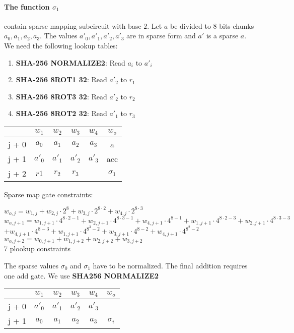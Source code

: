 \paragraph{The function $\sigma_1$} contain sparse mapping subcircuit with base $2$.
Let $a$ be divided to 8 bits-chunks $a_0, a_1, a_2, a_3$.
The values $a'_0, a'_1, a'_2, a'_3$ are in sparse form and $a'$ is a sparse $a$.
We need the following lookup tables:
\begin{enumerate}
\item \textbf{SHA-256 NORMALIZE2}: Read $a_i$ to $a'_i$
\item \textbf{SHA-256 8ROT1 32}: Read $a'_2$ to $r_1$
\item \textbf{SHA-256 8ROT3 32}: Read $a'_2$ to $r_2$ 
\item \textbf{SHA-256 8ROT2 32}: Read $a'_1$ to $r_3$ 
\end{enumerate}
\begin{center}
\begin{tabular}{ c|c|c|c|c|c } 
  & $w_1$ & $w_2$ & $w_3$ & $w_4$ & $w_o$\\ 
 \hline
j + 0 & $a_0$ & $ a_1$ & $a_2$ & $a_3$ & a\\ 
j + 1 & $a'_0$ & $a'_1$ & $a'_2$ & $a'_3$ & acc \\ 
j + 2 & $r1 $& $r_2$ & $r_3$ &   & $\sigma_1$ \\ 
\end{tabular}
\end{center}
Sparse map gate constraints:
\begin{center}
$w_{o,j} = w_{1,j} + w_{2,j} \cdot 2^8 + w_{3,j} \cdot 2^{8 \cdot 2} + w_{4,j} \cdot 2^{8 \cdot 3}$ \\
$w_{o,j + 1} = w_{1,j + 1} \cdot 4^{8 \cdot 2 - 1} + w_{2,j + 1} \cdot 4^{8 \cdot 3 - 1} + w_{4,j + 1} \cdot 4^{8 - 1}
	 	+ w_{1,j + 1} \cdot 4^{8 \cdot 2 - 3} + w_{2,j + 1} \cdot 4^{8 \cdot 3 - 3}$\\
	 $+ w_{4,j + 1} \cdot 4^{8 - 3}
	 	+ w_{1,j + 1} \cdot 4^{8^3 - 2} + w_{3,j + 1} \cdot 4^{8-2} + w_{4,j + 1} \cdot 4^{8^2 - 2}$ \\
$w_{o, j+2} = w_{0, j+1} + w_{1,j+2} + w_{2, j+2} + w_{3, j+2}$ \\
7 plookup constraints \\
\end{center}

The sparse values $\sigma_0$ and $\sigma_1$ have to be normalized.
The final addition requires one add gate.
We use \textbf{SHA256 NORMALIZE2}
\begin{center}
\begin{tabular}{ c|c|c|c|c|c } 
  & $w_1$ & $w_2$ & $w_3$ & $w_4$ & $w_o$\\ 
 \hline
j + 0 & $a'_0$ & $a'_1$ & $a'_2$ & $a'_3$ &\\ 
j + 1 & $a_0$ & $ a_1$ & $a_2$ & $a_3$ &  $\sigma_i$ \\ 
\end{tabular}
\end{center}

